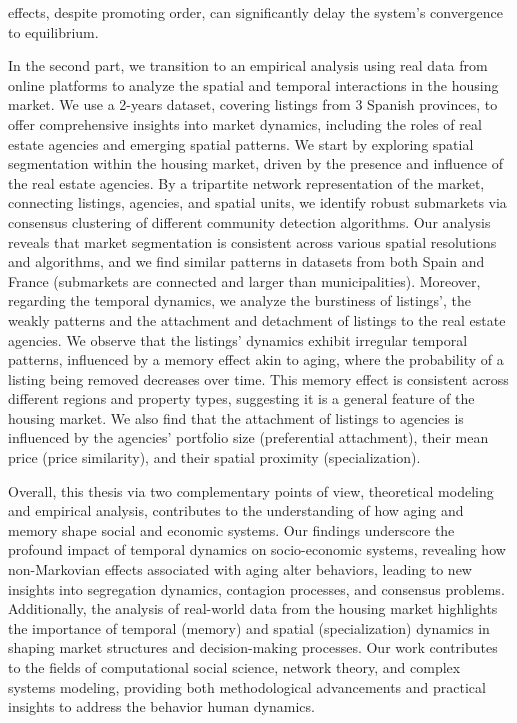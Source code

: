 effects, despite promoting order, can significantly delay the system's convergence to equilibrium.

In the second part, we transition to an empirical analysis using real data from online platforms to analyze the spatial and temporal interactions in the housing market. We use a 2-years dataset, covering listings from 3 Spanish provinces, to offer comprehensive insights into market dynamics, including the roles of real estate agencies and emerging spatial patterns. We start by exploring spatial segmentation within the housing market, driven by the presence and influence of the real estate agencies. By a tripartite network representation of the market, connecting listings, agencies, and spatial units, we identify robust submarkets via consensus clustering of different community detection algorithms. Our analysis reveals that market segmentation is consistent across various spatial resolutions and algorithms, and we find similar patterns in datasets from both Spain and France (submarkets are connected and larger than municipalities). Moreover, regarding the temporal dynamics, we analyze the burstiness of listings', the weakly patterns and the attachment and detachment of listings to the real estate agencies. We observe that the listings' dynamics exhibit irregular temporal patterns, influenced by a memory effect akin to aging, where the probability of a listing being removed decreases over time. This memory effect is consistent across different regions and property types, suggesting it is a general feature of the housing market. We also find that the attachment of listings to agencies is influenced by the agencies' portfolio size (preferential attachment), their mean price (price similarity), and their spatial proximity (specialization).

Overall, this thesis via two complementary points of view, theoretical modeling and empirical analysis, contributes to the understanding of how aging and memory shape social and economic systems. Our findings underscore the profound impact of temporal dynamics on socio-economic systems, revealing how non-Markovian effects associated with aging alter behaviors, leading to new insights into segregation dynamics, contagion processes, and consensus problems. Additionally, the analysis of real-world data from the housing market highlights the importance of temporal (memory) and spatial (specialization) dynamics in shaping market structures and decision-making processes. Our work contributes to the fields of computational social science, network theory, and complex systems modeling, providing both methodological advancements and practical insights to address the behavior human dynamics.


\vfill